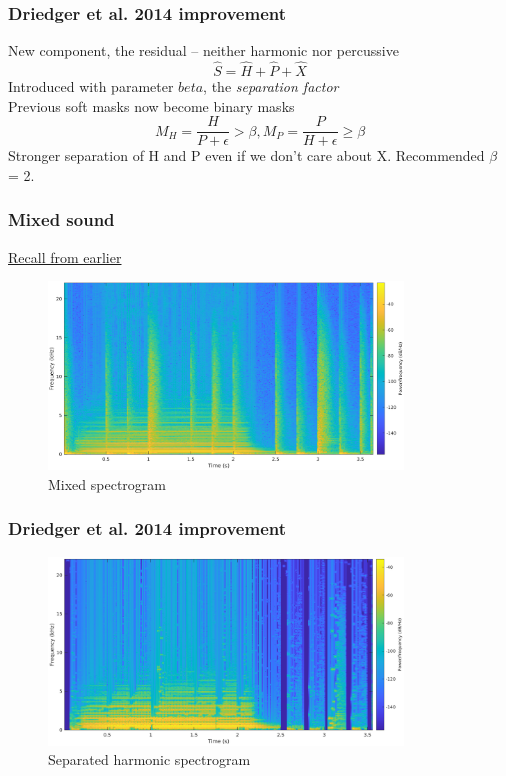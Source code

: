 \documentclass{beamer}
\begin{document}
\begin{frame}
	\frametitle{Driedger et al. 2014 improvement}
	New component, the residual -- neither harmonic nor percussive
	\[ \hat{S} = \hat{H} + \hat{P} + \hat{X} \]
	Introduced with parameter $beta$, the \textit{separation factor}\\
	Previous soft masks now become binary masks
	\[ M_{H} = \frac{H}{P + \epsilon} > \beta, M_{P} = \frac{P}{H + \epsilon} \ge \beta \]
	Stronger separation of H and P even if we don't care about X. Recommended $\beta$ = 2.
\end{frame}

\begin{frame}
	\frametitle{Mixed sound}
	\href{run:../audio/mixed.wav}{Recall from earlier}\
	\begin{figure}
	\includegraphics[height=5cm]{../images/mixedspecgram.png}
		\caption{Mixed spectrogram}
	\end{figure}
\end{frame}

\begin{frame}
	\frametitle{Driedger et al. 2014 improvement}
	\begin{figure}
	\includegraphics[height=5cm]{../images/harm_binary.png}
		\caption{Separated harmonic spectrogram}
	\end{figure}
\end{frame}
\end{document}
